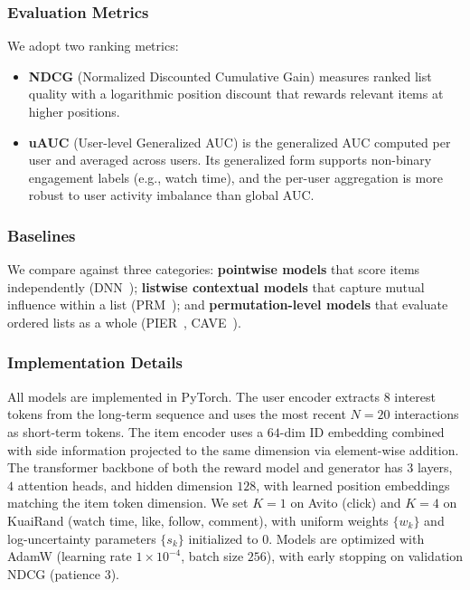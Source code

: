 \documentclass[sigconf]{acmart}
\begin{document}
\subsubsection{Evaluation Metrics}
We adopt two ranking metrics:
\begin{itemize}
    \item \textbf{NDCG} (Normalized Discounted Cumulative Gain) measures ranked list quality with a logarithmic position discount that rewards relevant items at higher positions.
    \item \textbf{uAUC} (User-level Generalized AUC) is the generalized AUC computed per user and averaged across users. Its generalized form supports non-binary engagement labels (e.g., watch time), and the per-user aggregation is more robust to user activity imbalance than global AUC.
\end{itemize}

\subsubsection{Baselines}
We compare against three categories: \textbf{pointwise models} that score items independently (DNN~\cite{covington2016deep}); \textbf{listwise contextual models} that capture mutual influence within a list (PRM~\cite{pei2019personalized}); and \textbf{permutation-level models} that evaluate ordered lists as a whole (PIER~\cite{shi2023pier}, CAVE~\cite{zhang2025generation}).

\subsubsection{Implementation Details}
All models are implemented in PyTorch. The user encoder extracts $8$ interest tokens from the long-term sequence and uses the most recent $N=20$ interactions as short-term tokens. The item encoder uses a $64$-dim ID embedding combined with side information projected to the same dimension via element-wise addition. The transformer backbone of both the reward model and generator has $3$ layers, $4$ attention heads, and hidden dimension $128$, with learned position embeddings matching the item token dimension. We set $K=1$ on Avito (click) and $K=4$ on KuaiRand (watch time, like, follow, comment), with uniform weights $\{w_k\}$ and log-uncertainty parameters $\{s_k\}$ initialized to $0$. Models are optimized with AdamW (learning rate $1\times 10^{-4}$, batch size $256$), with early stopping on validation NDCG (patience $3$).
\end{document}
